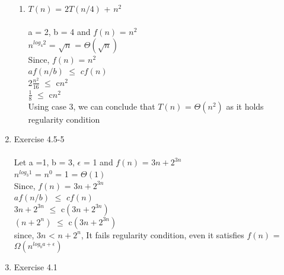 \documentclass{article}
\begin{document}
\begin{enumerate}
\begin{enumerate}
        \item $T(n)$ = $2T(n/4)$ + $n^2$\\\\
        a = 2, b = 4 and $f(n)$ = $n^2$\\
        $n^{log_4^{}2}$ = $\sqrt{n}$ = $\Theta(\sqrt{n})$\\
        Since, $f(n)$ = $n^2$\\
        $af(n/b)$ $\leq$ $cf(n)$\\
        2$\frac{n^2}{16}$ $\leq$ c$n^2$\\
        $\frac{1}{8}$ $\leq$ c$n^2$\\
        Using case 3, we can conclude that $T(n)$ = $\Theta(n^2)$ as it holds regularity condition\\ 
    \end{enumerate}
    \item Exercise 4.5-5\\\\
    Let a =1, b = 3, $\epsilon$ = 1 and $f(n)$ = $3n + 2^{3n}$\\
    $n^{log_3^{}1}$ = $n^0$ = 1 = $\Theta(1)$\\
    Since, $f(n)$ = $3n + 2^{3n}$\\
    $af(n/b)$ $\leq$ $cf(n)$\\
    $3n + 2^{3n}$ $\leq$ c$(3n + 2^{3n})$\\
    $(n + 2^n)$ $\leq$ c$(3n + 2^{3n})$\\
    since, $3n$ < $n + 2^n$, It fails regularity condition, even it satisfies $f(n)$ = $\Omega(n^{log_b^{}{a + \epsilon}})$ 
    
    \item Exercise 4.1 \\
    

\end{enumerate}
\end{document}
